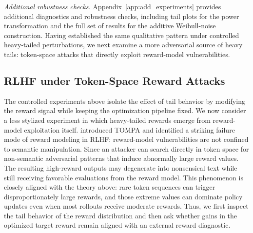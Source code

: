 \documentclass[11pt]{article}
\renewcommand{\paragraph}[1]{\noindent\textit{#1}}
\begin{document}
\paragraph{Additional robustness checks.}
Appendix~\ref{app:add_experiments} provides additional diagnostics and robustness checks, including tail plots for the power transformation and the full set of results for the additive Weibull-noise construction. Having established the same qualitative pattern under controlled heavy-tailed perturbations, we next examine a more adversarial source of heavy tails: token-space attacks that directly exploit reward-model vulnerabilities.


\subsection{RLHF under Token-Space Reward Attacks}\label{sec:tompa-experiments}\label{app:tompa}\label{app:toma}

The controlled experiments above isolate the effect of tail behavior by modifying
the reward signal while keeping the optimization pipeline fixed. We now consider
a less stylized experiment in which heavy-tailed rewards emerge from
reward-model exploitation itself. \citet{zhang2026beyond} introduced TOMPA and
identified a striking failure mode of reward modeling in RLHF: reward-model
vulnerabilities are not confined to semantic manipulation. Since an attacker
can search directly in token space for non-semantic adversarial patterns that
induce abnormally large reward values. The resulting high-reward outputs may
degenerate into nonsensical text while still receiving favorable evaluations
from the reward model. This phenomenon is closely aligned with the theory above:
rare token sequences can trigger disproportionately large rewards, and those
extreme values can dominate policy updates even when most rollouts receive
moderate rewards. Thus, we first inspect the tail behavior of the reward
distribution and then ask whether gains in the optimized target reward remain
aligned with an external reward diagnostic.
\end{document}
